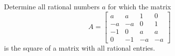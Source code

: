 \begin{problem}
    Determine all rational numbers \( a \) for which the matrix
    \[
        A = \begin{bmatrix}
            a & a & 1 & 0 \\
            -a & -a & 0 & 1 \\
            -1 & 0 & a & a \\
            0 & -1 & -a & -a
        \end{bmatrix}
    \]
    is the square of a matrix with all rational entries.
\end{problem}
